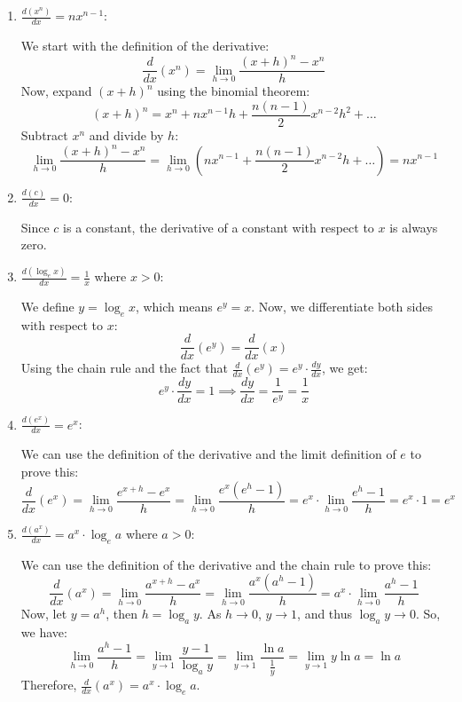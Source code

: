 \begin{enumerate}
    \item $\frac{d\left(x^n\right)}{dx} = nx^{n-1}$:
    
    \begin{outline}
        We start with the definition of the derivative:
    \[
    \frac{d}{dx}(x^n) = \lim_{h \to 0} \frac{(x+h)^n - x^n}{h}
    \]
    Now, expand $(x+h)^n$ using the binomial theorem:
    \[
    (x+h)^n = x^n + nx^{n-1}h + \frac{n(n-1)}{2}x^{n-2}h^2 + \dots
    \]
    Subtract $x^n$ and divide by $h$:
    \[
    \lim_{h \to 0} \frac{(x+h)^n - x^n}{h} = \lim_{h \to 0} \left(nx^{n-1} + \frac{n(n-1)}{2}x^{n-2}h + \dots\right) = nx^{n-1}
    \]
    \end{outline}

    \item $\frac{d(c)}{dx} = 0$:
    
    Since $c$ is a constant, the derivative of a constant with respect to $x$ is always zero.

    \item $\frac{d\left(\log_e x\right)}{dx} = \frac{1}{x}$ where $x > 0$:
    
    \begin{outline}
        We define $y = \log_e x$, which means $e^y = x$. Now, we differentiate both sides with respect to $x$:
    \[
    \frac{d}{dx}(e^y) = \frac{d}{dx}(x)
    \]
    Using the chain rule and the fact that $\frac{d}{dx}(e^y) = e^y \cdot \frac{dy}{dx}$, we get:
    \[
    e^y \cdot \frac{dy}{dx} = 1 \implies \frac{dy}{dx} = \frac{1}{e^y} = \frac{1}{x}
    \]
    \end{outline}

    \item $\frac{d\left(e^x\right)}{dx} = e^x$:
    
    \begin{outline}
        We can use the definition of the derivative and the limit definition of $e$ to prove this:
    \[
    \frac{d}{dx}(e^x) = \lim_{h \to 0} \frac{e^{x+h} - e^x}{h} = \lim_{h \to 0} \frac{e^x(e^h - 1)}{h} = e^x \cdot \lim_{h \to 0} \frac{e^h - 1}{h} = e^x \cdot 1 = e^x
    \]
    \end{outline}

    \item $\frac{d\left(a^x\right)}{dx} = a^x \cdot \log_e a$ where $a > 0$:
    
    \begin{outline}
        We can use the definition of the derivative and the chain rule to prove this:
    \[
    \frac{d}{dx}(a^x) = \lim_{h \to 0} \frac{a^{x+h} - a^x}{h} = \lim_{h \to 0} \frac{a^x(a^h - 1)}{h} = a^x \cdot \lim_{h \to 0} \frac{a^h - 1}{h}
    \]
    Now, let $y = a^h$, then $h = \log_a y$. As $h \to 0$, $y \to 1$, and thus $\log_a y \to 0$. So, we have:
    \[
    \lim_{h \to 0} \frac{a^h - 1}{h} = \lim_{y \to 1} \frac{y - 1}{\log_a y} = \lim_{y \to 1} \frac{\ln a}{\frac{1}{y}} = \lim_{y \to 1} y \ln a = \ln a
    \]
    Therefore, $\frac{d}{dx}(a^x) = a^x \cdot \log_e a$.
    \end{outline}



\end{enumerate}
